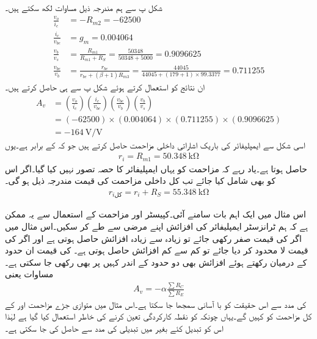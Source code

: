 شکل  پ سے ہم مندرجہ ذیل مساوات لکھ سکتے ہیں۔
\begin{align*}
\frac{v_o}{i_c}&=-R_{m2}=-62500\\
\frac{i_c}{v_{be}}&=g_m=0.004064 \\
\frac{v_b}{v_s}&=\frac{R_{m1}}{R_{m1}+R_S}=\frac{50348}{50348+5000}=0.9096625\\
\frac{v_{be}}{v_b}&=\frac{r_{be}}{r_{be}+(\beta+1)R_{m3}}=\frac{44045}{44045+(179+1) \times 99.3377}=0.711255
\end{align*}
ان نتائج کو استعمال کرتے ہوئے شکل  پ سے ہی  حاصل کرتے ہیں۔
\begin{align*}
A_v &=\left(\frac{v_o}{i_c} \right ) \left(\frac{i_c}{v_{be}} \right ) \left(\frac{v_{be}}{v_b} \right ) \left(\frac{v_b}{v_s} \right )\\
&=(-62500) \times (0.004064) \times (0.711255) \times (0.9096625)\\
&=\SI[per=frac,fraction=nice]{-164}{\volt \per \volt}
\end{align*}
اسی شکل سے ایمپلیفائر کی باریک اشاراتی داخلی مزاحمت حاصل کرتے ہیں جو کہ  کے برابر ہے۔یوں
\begin{align*}
r_i=R_{m1}=\SI{50.348}{\kilo \ohm}
\end{align*}
حاصل ہوتا ہے۔یاد رہے کہ مزاحمت  کو یہاں ایمپلیفائر کا حصہ تصور نہیں کیا گیا۔اگر اس کو بھی شامل کیا جائے تب کل داخلی مزاحمت کی قیمت مندرجہ ذیل ہو گی۔
\begin{align*}
r_{i\textrm{کل}}=r_i+R_S=\SI{55.348}{\kilo \ohm}
\end{align*}

اس مثال میں ایک اہم بات سامنے آئی۔کپیسٹر  اور مزاحمت  کے استعمال سے یہ ممکن ہے کہ ہم ٹرانزسٹر ایمپلیفائر کی افزائش اپنے مرضی سے طے کر سکیں۔اس مثال میں اگر  کی قیمت صفر رکھی جائے تو زیادہ سے زیادہ افزائش حاصل ہوتی ہے اور اگر   کی قیمت لا محدود کر دیا جائے تو کم سے کم افزائش حاصل ہوتی ہے۔  کی قیمت ان حدود کے درمیان رکھتے ہوئے افزائش بھی دو حدود کے اندر کہیں پر بھی رکھی جا سکتی ہے۔مساوات   یعنی
\begin{align*}
A_v= -\alpha \frac{\sum R_C}{\sum R_E}
\end{align*}
کی مدد سے اس حقیقت کو با آسانی سمجھا جا سکتا ہے۔اس مثال میں متوازی جڑے مزاحمت  اور  کے کل مزاحمت کو  کہیں گے۔یہاں چونکہ   کو نقطہ کارکردگی تعین کرنے کی خاطر استعمال کیا گیا ہے لہٰذا اس کو تبدیل کئے بغیر  میں تبدیلی  کی مدد سے حاصل کی جا سکتی ہے۔

